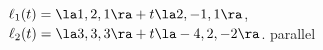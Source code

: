 {$\ell_1(t) = \la 1,2,1\ra + t\la 2,-1,1\ra$,\\
$\ell_2(t) = \la 3,3,3\ra + t\la -4,2,-2\ra$.
}
{parallel
}

